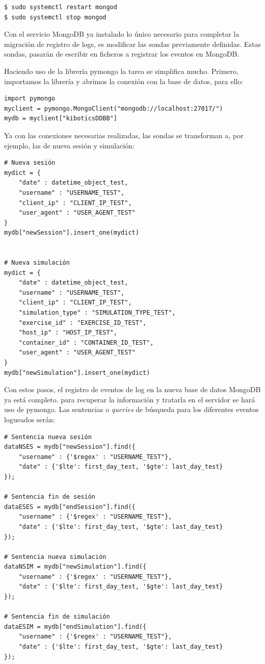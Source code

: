 \documentclass[11pt,a4paper]{book}
\begin{document}
			\begin{Verbatim}[tabsize=4]
$ sudo systemctl restart mongod
$ sudo systemctl stop mongod
			\end{Verbatim}
			
			Con el servicio MongoDB ya instalado lo único necesario para completar la migración de registro de logs, es modificar las sondas previamente definidas. Estas sondas, pasarán de escribir en ficheros a registrar los eventos en MongoDB.
			
			Haciendo uso de la librería pymongo la tarea se simplifica mucho. Primero, importamos la librería y abrimos la conexión con la base de datos, para ello: 
			
			\begin{Verbatim}[tabsize=4]
import pymongo
myclient = pymongo.MongoClient("mongodb://localhost:27017/")
mydb = myclient["kiboticsDDBB"]
			\end{Verbatim}
			
			Ya con las conexiones necesarias realizadas, las sondas se transforman a, por ejemplo, las de nueva sesión y simulación:
			\begin{Verbatim}[tabsize=4]
# Nueva sesión
mydict = {
	"date" : datetime_object_test, 
	"username" : "USERNAME_TEST", 
	"client_ip" : "CLIENT_IP_TEST", 
	"user_agent" : "USER_AGENT_TEST"
}
mydb["newSession"].insert_one(mydict)


# Nueva simulación
mydict = {
	"date" : datetime_object_test, 
	"username" : "USERNAME_TEST", 
	"client_ip" : "CLIENT_IP_TEST", 
	"simulation_type" : "SIMULATION_TYPE_TEST",
	"exercise_id" : "EXERCISE_ID_TEST",
	"host_ip" : "HOST_IP_TEST",
	"container_id" : "CONTAINER_ID_TEST",
	"user_agent" : "USER_AGENT_TEST"
}
mydb["newSimulation"].insert_one(mydict)
			\end{Verbatim}

			
			Con estos pasos, el registro de eventos de log en la nueva base de datos MongoDB ya está completo. para recuperar la información y tratarla en el servidor se hará uso de pymongo. Las sentencias o \textit{queries} de búsqueda para los diferentes eventos logueados serán:
		
		
			\begin{Verbatim}[tabsize=4]
# Sentencia nueva sesión
dataNSES = mydb["newSession"].find({
	"username" : {'$regex' : "USERNAME_TEST"}, 
	"date" : {'$lte': first_day_test, '$gte': last_day_test}
});

# Sentencia fin de sesión	
dataESES = mydb["endSession"].find({
	"username" : {'$regex' : "USERNAME_TEST"}, 
	"date" : {'$lte': first_day_test, '$gte': last_day_test}
});

# Sentencia nueva simulación
dataNSIM = mydb["newSimulation"].find({
	"username" : {'$regex' : "USERNAME_TEST"}, 
	"date" : {'$lte': first_day_test, '$gte': last_day_test}
});

# Sentencia fin de simulación
dataESIM = mydb["endSimulation"].find({
	"username" : {'$regex' : "USERNAME_TEST"},
	"date" : {'$lte': first_day_test, '$gte': last_day_test}
});

			\end{Verbatim}	
			
\end{document}
